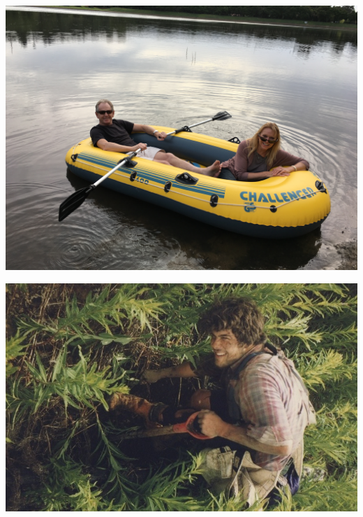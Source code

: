 \documentclass{beamer}
\begin{document}
\begin{frame}
\begin{center}
\includegraphics[scale = 0.04]{IMG_0703.JPG}

\includegraphics[scale = 0.2]{JonathanTreeRot.jpg}
\end{center}
\end{frame}
\end{document}
